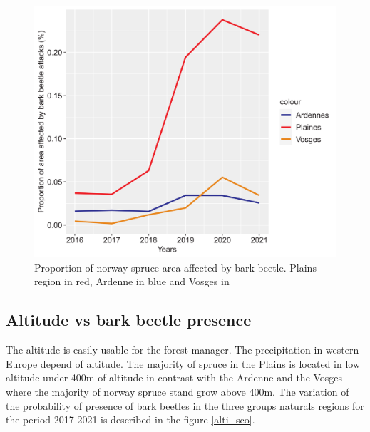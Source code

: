 \documentclass[3p,procedia]{elsarticle}
\begin{document}
\begin{figure}
   \centering
   \includegraphics[width=0.6 \textwidth]{Annual_evol_Ardennes_vosges_plaines.png}
    \caption{Proportion of norway spruce area affected by bark beetle. Plains region in red, Ardenne in blue and Vosges in }
    \label{evol_gen}
\end{figure}

    


\subsection{ Altitude vs bark beetle presence}
The altitude is easily usable for the forest manager.
The precipitation in western Europe depend of altitude. 
The majority of spruce in the Plains is located in low altitude under 400m of altitude in contrast with the Ardenne and the Vosges where the majority of norway spruce stand grow above 400m. 
The variation of the probability of presence of bark beetles in the three groups naturals regions for the period 2017-2021 is described in the figure \ref{alti_sco}.
\end{document}
